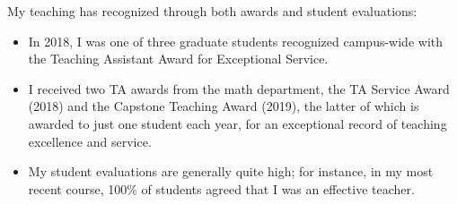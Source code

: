 \documentclass[11pt]{article}
\begin{document}
My teaching has recognized through both awards and student evaluations:
\begin{itemize}
\item In 2018, I was one of three graduate students recognized campus-wide with the Teaching Assistant Award for Exceptional Service.
\item I received two TA awards from the math department, the TA Service Award (2018) and the Capstone Teaching Award (2019), the latter of which is awarded to just one student each year, for an exceptional record of teaching excellence and service.
\item My student evaluations are generally quite high; for instance, in my most recent course, 100\% of students agreed that I was an effective teacher.
\end{itemize}
%
%
%
\end{document}
